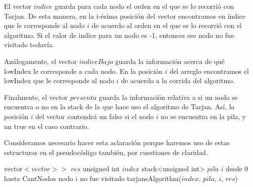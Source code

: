 \quad El vector $indice$ guarda para cada nodo el orden en el que se lo recorrió con Tarjan. De esta manera, en la i-ésima posición del vector encontramos en índice que le corresponde al nodo $i$ de acuerdo al orden en el que se lo recorrió con el algoritmo. Si el valor de indice para un nodo es -1, entonces ese nodo no fue visitado todavía.

\quad Análogamente, el vector $indiceBajo$ guarda la información acerca de qué lowIndex le corresponde a cada nodo. En la posición $i$ del arreglo encontramos el lowIndex que le corresponde al nodo $i$ de acuerdo a la corrida del algoritmo.

\quad Finalmente, el vector $presenta$ guarda la información relativa a si un nodo se encuentra o no en la stack de la que hace uso el algoritmo de Tarjan. Así, la posición $i$ del vector contendrá un false si el nodo $i$ no se encuentra en la pila, y un true en el caso contrario.

\quad Consideramos necesario hacer esta aclaración porque haremos uso de estas estructuras en el pseudocódigo también, por cuestiones de claridad.





\begin{algorithm}[H]
\caption{} 
\begin{codebox}
\li vector$<vector>>$ $res$
\li unsigned int $index$
\li stack<unsigned int> $pila$
\li
\li \For $i$ desde 0 hasta CantNodos \Do
\li	\If nodo $i$ no fue visitado \Do
\li	tarjansAlgorithm($index$, $pila$, $i$, $res$)
	\End	
    \End
\End
\end{codebox}
\end{algorithm}


\begin{algorithm}[H]
\caption{} 
\end{algorithm}


